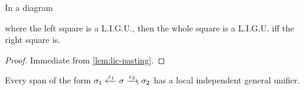 \begin{lemma}\label{lem:ligu-pasting}
    In a diagram
    where the left square is a L.I.G.U., then the whole square is a L.I.G.U. iff the right square is.
\end{lemma}
\begin{proof}
    Immediate from \cref{lem:lic-pasting}.
\end{proof}

\begin{lemma}\label{lem:ligu-rmono-exist}
    Every span of the form $\sigma_1 \xfrom{\me_1} \sigma \xrto{\me_2} \sigma_2$ has a local independent general unifier.
\end{lemma}

